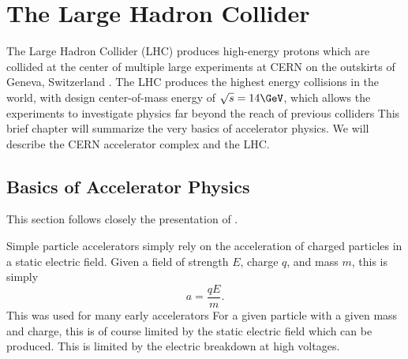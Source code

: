 

\chapter[The Large Hadron Collider][Top of Page Title]{The Large Hadron Collider}

The Large Hadron Collider (LHC) produces high-energy protons which are collided at the center of multiple large experiments at CERN on the outskirts of Geneva, Switzerland \cite{Evans:2008zzb}.
The LHC produces the highest energy collisions in the world, with design center-of-mass energy of $\sqrt{s} = 14 \GeV$, which allows the experiments to investigate physics far beyond the reach of previous colliders 
This brief chapter will summarize the very basics of accelerator physics.
We will describe the CERN accelerator complex and the LHC.

\section{Basics of Accelerator Physics}

This section follows closely the presentation of \cite{ShiltsevColliderLectures}.

Simple particle accelerators simply rely on the acceleration of charged particles in a static electric field.
Given a field of strength $E$, charge $q$, and mass $m$, this is simply
\begin{equation}
a = \frac{qE}{m}.
\end{equation}
This was used for many early accelerators 
For a given particle with a given mass and charge, this is of course limited by the static electric field which can be produced.
This is limited by the electric breakdown at high voltages.


